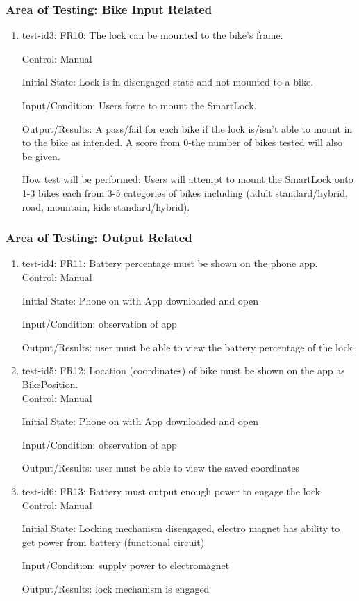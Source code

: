 \documentclass[12pt, titlepage]{article}
\begin{document}
\subsubsection{Area of Testing: Bike Input Related}

\begin{enumerate}

\item{test-id3: FR10: The lock can be mounted to the bike’s frame. \\}

Control: Manual

Initial State: Lock is in disengaged state and not mounted to a bike.

Input/Condition: Users force to mount the SmartLock.

Output/Results: A pass/fail for each bike if the lock is/isn’t able to mount in to the bike as intended. A score from 0-the number of bikes tested will also be given.

How test will be performed: Users will attempt to mount the SmartLock onto 1-3 bikes each from 3-5 categories of bikes including (adult standard/hybrid, road, mountain, kids standard/hybrid).

\end{enumerate}

\subsubsection{Area of Testing: Output Related}

\begin{enumerate}

\item{test-id4: FR11: Battery percentage must be shown on the phone app. \\}
Control: Manual 

Initial State: Phone on with App downloaded and open 

Input/Condition: observation of app 

Output/Results: user must be able to view the battery percentage of the lock 

\item{test-id5: FR12: Location (coordinates) of bike must be shown on the app as BikePosition. \\}
Control: Manual 

Initial State: Phone on with App downloaded and open 

Input/Condition: observation of app 

Output/Results: user must be able to view the saved coordinates 

\item{test-id6: FR13: Battery must output enough power to engage the lock. \\}
Control: Manual 

Initial State: Locking mechanism disengaged, electro magnet has ability to get power from battery (functional circuit) 

Input/Condition: supply power to electromagnet 

Output/Results: lock mechanism is engaged 

\end{enumerate}
\end{document}
